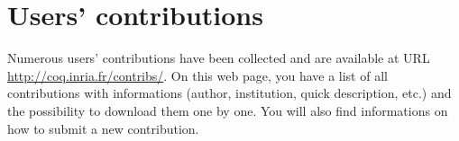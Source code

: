 \section[Users' contributions]{Users' contributions
\label{Contributions}}

Numerous users' contributions have been collected and are available at
URL \url{http://coq.inria.fr/contribs/}.  On this web page, you have a list
of all contributions with informations (author, institution, quick
description, etc.) and the possibility to download them one by one.
You will also find informations on how to submit a new
contribution.

